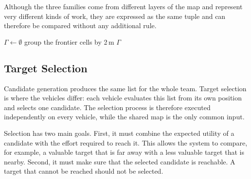 Although the three families come from different layers of the map and represent
very different kinds of work, they are expressed as the same tuple and can
therefore be compared without any additional rule.

\begin{algorithm}[!htb]
    \caption{GenerateCandidates}%
    \label{algo:sys:generate}
    $\Gamma \gets \emptyset$\;
    group the frontier cells by 2\,m\;
    \KwRet$\Gamma$\;
\end{algorithm}

\FloatBarrier

\subsection{Target Selection}%
\label{sec:sys:scoring}

Candidate generation produces the same list for the whole team. Target selection
is where the vehicles differ: each vehicle evaluates this list from its own
position and selects one candidate. The selection process is therefore executed
independently on every vehicle, while the shared map is the only common input.

Selection has two main goals. First, it must combine the expected utility of a
candidate with the effort required to reach it. This allows the system to
compare, for example, a valuable target that is far away with a less valuable
target that is nearby. Second, it must make sure that the selected candidate is
reachable. A target that cannot be reached should not be selected.

